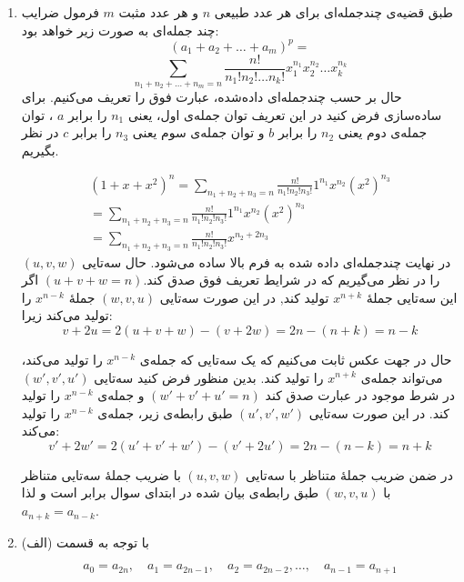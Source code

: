 	\begin{enumerate}
		\item 
        \p
        طبق قضیه‌ی چندجمله‌ای برای هر عدد
         طبیعی 
         $n$
         و هر عدد مثبت 
         $m$ 
         فرمول ضرایب چند جمله‌ای به صورت زیر خواهد بود:
        $$(a_1+a_2+\ldots+a_m)^p = $$
        $$\sum_{n_1+n_2+\ldots+n_m=n} \frac{n!}{n_1!n_2!\ldots n_k!} x_1^{n_1}x_2^{n_2}\ldots x_k^{n_k}$$
        حال بر حسب چندجمله‌ای داده‌شده، عبارت فوق را تعریف می‌کنیم. برای ساده‌سازی فرض کنید در این تعریف توان جمله‌ی اول، یعنی
        $n_1$
        را برابر $a$ ،
        توان جمله‌ی دوم یعنی 
        $n_2$
        را برابر 
        $b$
        و توان جمله‌ی سوم یعنی
        $n_3$
        را برابر $c$ در نظر بگیریم.
        
        \begin{align*}
		(1+x+x^2)^n = \sum_{n_1+n_2+n_3=n} \frac{n!}{n_1!n_2!n_3!} 1^{n_1} x^{n_2} (x^{2})^{n_3}\\
		= \sum_{n_1+n_2+n_3=n} \frac{n!}{n_1!n_2!n_3!} 1^{n_1} x^{n_2} (x^2)^{n_3}\\
		= \sum_{n_1+n_2+n_3=n} \frac{n!}{n_1!n_2!n_3!} x^{n_2 + 2n_3}
        \end{align*}
		در نهایت چندجمله‌ای داده شده به فرم بالا ساده می‌شود.
		حال سه‌تایی $(u , v , w)$ را در نظر می‌گیریم که در شرایط تعریف فوق صدق کند.$(u + v + w = n)$
        اگر این سه‌تایی  جملهٔ $x^{n + k}$ تولید کند, در این صورت سه‌تایی $(w , v , u)$ جملهٔ $x^{n - k}$ را تولید می‌کند زیرا:
        $$v + 2u = 2(u + v + w) - (v + 2w) = 2n - (n + k) = n -k$$
        
        \p
        حال در جهت عکس ثابت می‌کنیم که یک سه‌تایی که جمله‌ی
        $x^{n-k}$
        را تولید می‌کند، می‌تواند جمله‌ی
        $x^{n+k}$
        را تولید کند. بدین منظور فرض کنید سه‌تایی
        $(w', v', u')$
        در شرط موجود در عبارت صدق کند
        $(w' + v' + u'=n)$
        و جمله‌ی
        $x^{n-k}$
        را تولید کند.
        در این صورت سه‌تایی
        $(u',v',w')$
        طبق رابطه‌ی زیر، جمله‌ی 
        $x^{n-k}$
        را تولید می‌کند:
    	$$v' + 2w' = 2(u' + v' + w') - (v' + 2u') = 2n - (n - k) = n +k$$
	
        \p
    	در ضمن ضریب جملهٔ متناظر با سه‌تایی $(u , v , w)$ با ضریب جملهٔ سه‌تایی متناظر با $(w , v , u)$ طبق رابطه‌ی بیان شده در ابتدای سوال برابر است و لذا $a_{n + k} = a_{n - k}$.
	
	\item
        \p
    	با توجه به قسمت (الف) 
    
    	$$a_0 = a_{2n},\quad a_1 = a_{2n - 1},\quad a_2 = a_{2n - 2}, \dots ,\quad a_{n - 1} = a_{n + 1}$$
    

\end{enumerate}
